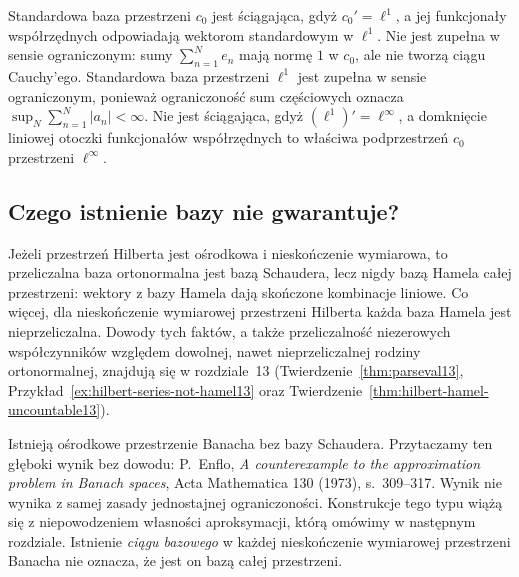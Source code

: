 \begin{przyklad}
\label{ex:james-examples27}
Standardowa baza przestrzeni $c_0$ jest ściągająca,
gdyż $c_0'=\ell^1$, a jej funkcjonały współrzędnych
odpowiadają wektorom standardowym w $\ell^1$.
Nie jest zupełna w sensie ograniczonym: sumy
$\sum_{n=1}^Ne_n$ mają normę $1$ w $c_0$, ale
nie tworzą ciągu Cauchy'ego.
Standardowa baza przestrzeni $\ell^1$ jest zupełna w sensie
ograniczonym, ponieważ ograniczoność sum częściowych oznacza
$\sup_N\sum_{n=1}^N|a_n|<\infty$.
Nie jest ściągająca, gdyż $(\ell^1)'=\ell^\infty$,
a domknięcie liniowej otoczki funkcjonałów współrzędnych
to właściwa podprzestrzeń $c_0$ przestrzeni $\ell^\infty$.
\end{przyklad}

\subsection{Czego istnienie bazy nie gwarantuje?}

\begin{uwaga}
\label{rem:hamel-vs-schauder27}
Jeżeli przestrzeń Hilberta jest ośrodkowa i nieskończenie
wymiarowa, to przeliczalna baza ortonormalna jest bazą
Schaudera, lecz nigdy bazą Hamela całej przestrzeni:
wektory z bazy Hamela dają skończone kombinacje liniowe.
Co więcej, dla nieskończenie wymiarowej przestrzeni Hilberta
każda baza Hamela jest nieprzeliczalna. Dowody tych faktów,
a także przeliczalność niezerowych współczynników
względem dowolnej, nawet nieprzeliczalnej rodziny
ortonormalnej, znajdują się w rozdziale~13 (Twierdzenie~\ref{thm:parseval13},
Przykład~\ref{ex:hilbert-series-not-hamel13} oraz
Twierdzenie~\ref{thm:hilbert-hamel-uncountable13}).
\end{uwaga}

\begin{uwaga}
\label{rem:enflo27}
Istnieją ośrodkowe przestrzenie Banacha bez bazy Schaudera.
Przytaczamy ten głęboki wynik bez dowodu: P.~Enflo,
\emph{A counterexample to the approximation problem in Banach
spaces}, Acta Mathematica 130 (1973), s.~309--317.
Wynik nie wynika z samej zasady jednostajnej ograniczoności. Konstrukcje tego typu
wiążą się z niepowodzeniem własności aproksymacji,
którą omówimy w następnym rozdziale. Istnienie
\emph{ciągu bazowego} w każdej nieskończenie wymiarowej
przestrzeni Banacha nie oznacza, że jest on bazą całej
przestrzeni.
\end{uwaga}
